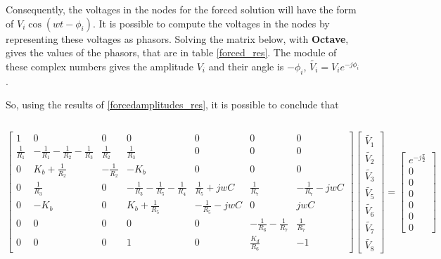 
Consequently, the voltages in the nodes for the forced solution will have the form of $V_i\cos(wt-\phi_i)$. It is possible to compute the voltages in the nodes by representing these voltages as phasors. Solving the matrix below, with {\bf Octave}, gives the values of the phasors, that are in table \ref{forced_res}. The module of these complex numbers gives the amplitude $V_i$ and their angle is $-\phi_i$, $\widetilde{V_i} = V_ie^{-j\phi_i}$.

So, using the results of \ref{forcedamplitudes_res}, it is possible to conclude that

\begin{equation}
  
\end{equation}


\begin{equation}
  \begin{bmatrix}
    1 & 0 & 0 & 0 & 0 & 0 & 0 \\
    \frac{1}{R_1} & -\frac{1}{R_1}-\frac{1}{R_2}-\frac{1}{R_3} & \frac{1}{R_2} & \frac{1}{R_3} & 0 & 0 & 0 \\
    0 & K_b + \frac{1}{R_2} & -\frac{1}{R_2} & -K_b & 0 & 0 & 0 \\
    0 & \frac{1}{R_3} & 0 & -\frac{1}{R_3}-\frac{1}{R_5}-\frac{1}{R_4} & \frac{1}{R_5}+jwC & \frac{1}{R_7} & -\frac{1}{R_7}-jwC \\
    0 & -K_b & 0 & K_b+\frac{1}{R_5} & -\frac{1}{R_5}-jwC & 0 & jwC \\
    0 & 0 & 0 & 0 & 0 & -\frac{1}{R_6}-\frac{1}{R_7} & \frac{1}{R_7} \\
    0 & 0 & 0 & 1 & 0 & \frac{K_d}{R_6} & -1     
  \end{bmatrix}
  \begin{bmatrix}
    \widetilde{V_1} \\
    \widetilde{V_2} \\
    \widetilde{V_3} \\
    \widetilde{V_5} \\
    \widetilde{V_6} \\
    \widetilde{V_7} \\
    \widetilde{V_8}
  \end{bmatrix}
  =
  \begin{bmatrix}
    e^{-j\frac{\pi}{2}} \\
    0 \\
    0 \\
    0 \\
    0 \\
    0 \\
    0
  \end{bmatrix}
  \label{pha}
\end{equation}

